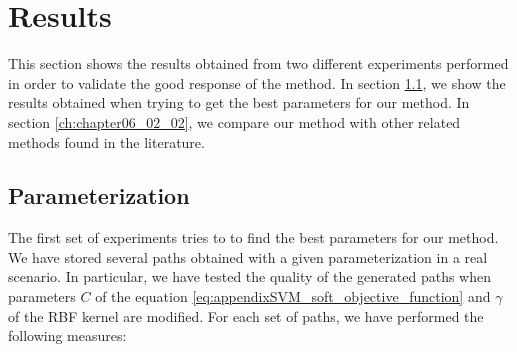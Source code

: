 \section{Results}\label{ch:chapter06_02}

This section shows the results obtained from two different experiments performed in order to validate the good response of the method. In section \ref{ch:chapter06_02_01}, we show the results obtained when trying to get the best parameters for our method. In section \ref{ch:chapter06_02_02}, we compare our method with other related methods found in the literature.

\subsection{Parameterization}\label{ch:chapter06_02_01}

The first set of experiments tries to to find the best parameters for our method. We have stored several paths obtained with a given parameterization in a real scenario. In particular, we have tested the quality of the generated paths when parameters $C$ of the equation \ref{eq:appendixSVM_soft_objective_function} and $\gamma$ of the \ac{RBF} kernel are modified. For each set of paths, we have performed the following measures:

